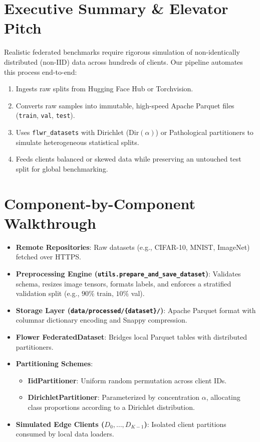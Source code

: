 \documentclass[11pt,a4paper,titlepage]{report}
\begin{document}
\section{Executive Summary \& Elevator Pitch}
\begin{elevatorpitch}
Realistic federated benchmarks require rigorous simulation of non-identically distributed (non-IID) data across hundreds of clients. Our pipeline automates this process end-to-end:
\begin{enumerate}[leftmargin=*]
    \item Ingests raw splits from Hugging Face Hub or Torchvision.
    \item Converts raw samples into immutable, high-speed Apache Parquet files (\texttt{train}, \texttt{val}, \texttt{test}).
    \item Uses \texttt{flwr\_datasets} with Dirichlet ($\text{Dir}(\alpha)$) or Pathological partitioners to simulate heterogeneous statistical splits.
    \item Feeds clients balanced or skewed data while preserving an untouched test split for global benchmarking.
\end{enumerate}
\end{elevatorpitch}

\section{Component-by-Component Walkthrough}
\begin{itemize}[leftmargin=*]
    \item \textbf{Remote Repositories}: Raw datasets (e.g., CIFAR-10, MNIST, ImageNet) fetched over HTTPS.
    \item \textbf{Preprocessing Engine (\texttt{utils.prepare\_and\_save\_dataset})}: Validates schema, resizes image tensors, formats labels, and enforces a stratified validation split (e.g., $90\%$ train, $10\%$ val).
    \item \textbf{Storage Layer (\texttt{data/processed/\{dataset\}/})}: Apache Parquet format with columnar dictionary encoding and Snappy compression.
    \item \textbf{Flower FederatedDataset}: Bridges local Parquet tables with distributed partitioners.
    \item \textbf{Partitioning Schemes}:
        \begin{itemize}
            \item \textbf{IidPartitioner}: Uniform random permutation across client IDs.
            \item \textbf{DirichletPartitioner}: Parameterized by concentration $\alpha$, allocating class proportions according to a Dirichlet distribution.
        \end{itemize}
    \item \textbf{Simulated Edge Clients ($D_0, \dots, D_{K-1}$)}: Isolated client partitions consumed by local data loaders.
\end{itemize}
\end{document}
